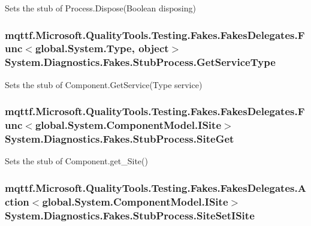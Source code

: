 Sets the stub of Process.\-Dispose(\-Boolean disposing)

\hypertarget{class_system_1_1_diagnostics_1_1_fakes_1_1_stub_process_a5f1b52f3f8ae4e0b263a0abda74a0adf}{
\subsubsection[{Get\-Service\-Type}]{\setlength{\rightskip}{0pt plus 5cm}mqttf.\-Microsoft.\-Quality\-Tools.\-Testing.\-Fakes.\-Fakes\-Delegates.\-Func$<$global.\-System.\-Type, object$>$ System.\-Diagnostics.\-Fakes.\-Stub\-Process.\-Get\-Service\-Type}}\label{class_system_1_1_diagnostics_1_1_fakes_1_1_stub_process_a5f1b52f3f8ae4e0b263a0abda74a0adf}


Sets the stub of Component.\-Get\-Service(\-Type service)

\hypertarget{class_system_1_1_diagnostics_1_1_fakes_1_1_stub_process_a1b5e62066070ad0ef55b7b7b6c346b26}{
\subsubsection[{Site\-Get}]{\setlength{\rightskip}{0pt plus 5cm}mqttf.\-Microsoft.\-Quality\-Tools.\-Testing.\-Fakes.\-Fakes\-Delegates.\-Func$<$global.\-System.\-Component\-Model.\-I\-Site$>$ System.\-Diagnostics.\-Fakes.\-Stub\-Process.\-Site\-Get}}\label{class_system_1_1_diagnostics_1_1_fakes_1_1_stub_process_a1b5e62066070ad0ef55b7b7b6c346b26}


Sets the stub of Component.\-get\-\_\-\-Site()

\hypertarget{class_system_1_1_diagnostics_1_1_fakes_1_1_stub_process_acd6cc4acb34074aee3a0b30a3b044f4b}{
\subsubsection[{Site\-Set\-I\-Site}]{\setlength{\rightskip}{0pt plus 5cm}mqttf.\-Microsoft.\-Quality\-Tools.\-Testing.\-Fakes.\-Fakes\-Delegates.\-Action$<$global.\-System.\-Component\-Model.\-I\-Site$>$ System.\-Diagnostics.\-Fakes.\-Stub\-Process.\-Site\-Set\-I\-Site}}\label{class_system_1_1_diagnostics_1_1_fakes_1_1_stub_process_acd6cc4acb34074aee3a0b30a3b044f4b}


